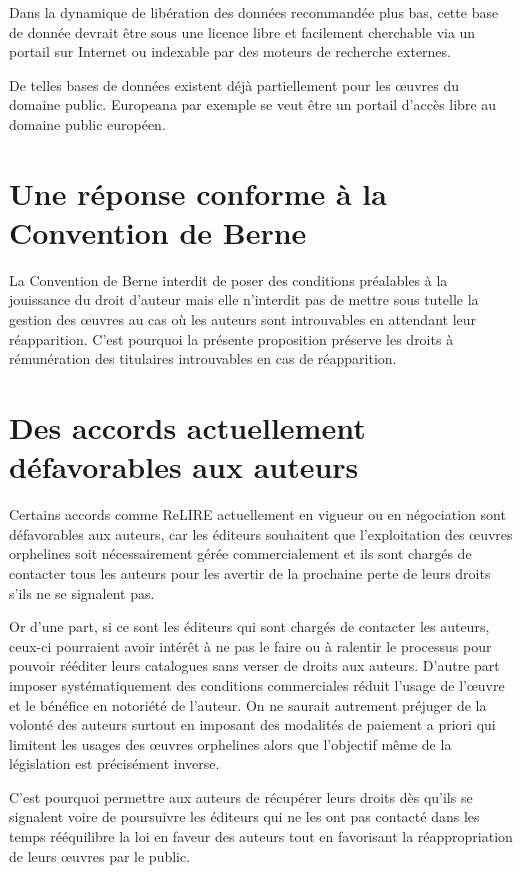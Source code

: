 Dans la dynamique de libération des données recommandée plus bas, cette base de donnée devrait être sous une licence libre et facilement cherchable via un portail sur Internet ou indexable par des moteurs de recherche externes. 

De telles bases de données existent déjà partiellement pour les œuvres du domaine public. Europeana par exemple se veut être un portail d'accès libre au domaine public européen.

\section{Une réponse conforme à la Convention de Berne}
La Convention de Berne interdit de poser des conditions préalables à la jouissance du droit d'auteur mais elle n'interdit pas de mettre sous tutelle la gestion des œuvres au cas où les auteurs sont introuvables en attendant leur réapparition. C'est pourquoi la présente proposition préserve les droits à rémunération des titulaires introuvables en cas de réapparition.

\section{Des accords actuellement défavorables aux auteurs}

Certains accords comme ReLIRE actuellement en vigueur ou en négociation sont défavorables aux auteurs, car les éditeurs souhaitent que l'exploitation des œuvres orphelines soit nécessairement gérée commercialement et ils sont chargés de contacter tous les auteurs pour les avertir de la prochaine perte de leurs droits s'ils ne se signalent pas. 

Or d'une part, si ce sont les éditeurs qui sont chargés de contacter les auteurs, ceux-ci pourraient avoir intérêt à ne pas le faire ou à ralentir le processus pour pouvoir rééditer leurs catalogues sans verser de droits aux auteurs. D'autre part imposer systématiquement des conditions commerciales réduit l'usage de l'œuvre et le bénéfice en notoriété de l'auteur. On ne saurait autrement préjuger de la volonté des auteurs surtout en imposant des modalités de paiement a priori qui limitent les usages des œuvres orphelines alors que l'objectif même de la législation est précisément inverse.

C'est pourquoi permettre aux auteurs de récupérer leurs droits dès qu'ils se signalent voire de poursuivre les éditeurs qui ne les ont pas contacté dans les temps rééquilibre la loi en faveur des auteurs tout en favorisant la réappropriation de leurs œuvres par le public. 





